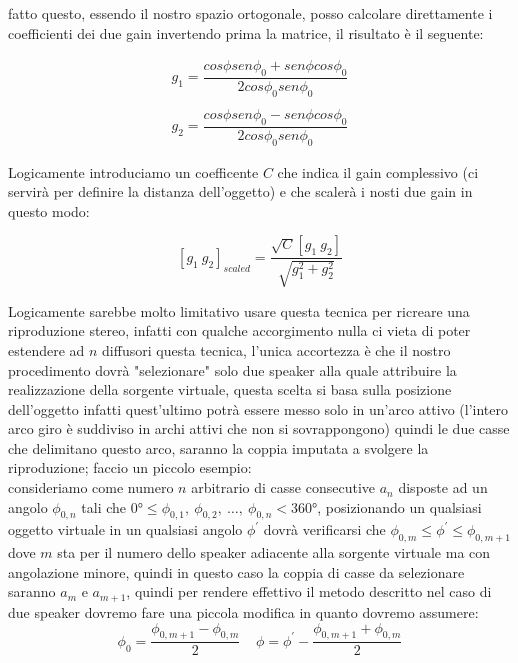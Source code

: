 \documentclass[12pt,a4paper]{report}
\begin{document}
fatto questo, essendo il nostro spazio ortogonale, posso calcolare direttamente i coefficienti dei due gain invertendo prima la matrice, il risultato è il seguente:

\begin{equation}\begin{split}
g_1=\dfrac{cos\phi sen\phi_0 + sen \phi cos\phi_0}{2 cos\phi_0 sen\phi_0}\\ \\
g_2=\dfrac{cos\phi sen\phi_0 - sen \phi cos\phi_0}{2 cos\phi_0 sen\phi_0}
\end{split}
\label{eq:eeee}
\end{equation}

Logicamente introduciamo un coefficente $C$ che indica il gain complessivo (ci servirà per definire la distanza dell'oggetto) e che scalerà i nosti due gain in questo modo:

\begin{equation}
\left[g_1 \ g_2\right]_{scaled} = \dfrac{\sqrt{C} \left[ g_1 \ g_2 \right]}{\sqrt{g_1^2 + g_2^2}} 
\label{eq:ffff}
\end{equation}

Logicamente sarebbe molto limitativo usare questa tecnica per ricreare una riproduzione stereo, infatti con qualche accorgimento nulla ci vieta di poter estendere ad $n$ diffusori questa tecnica, l'unica accortezza è che il nostro procedimento dovrà "selezionare" solo due speaker alla quale attribuire la realizzazione della sorgente virtuale, questa scelta si basa sulla posizione dell'oggetto infatti quest'ultimo potrà essere messo solo in un'arco attivo (l'intero arco giro è suddiviso in archi attivi che non si sovrappongono) quindi le due casse che delimitano questo arco, saranno la coppia imputata a svolgere la riproduzione; faccio un piccolo esempio:\\

consideriamo come numero $n$ arbitrario di casse consecutive $a_n$ disposte ad un angolo $\phi_{0,n}$ tali che $0°\leq \phi_{0,1},\ \phi_{0,2},\ \ldots,\ \phi_{0,n} <360°$, posizionando un qualsiasi oggetto virtuale in un qualsiasi angolo $\phi^{\prime}$ dovrà verificarsi che $\phi_{0,m}\leq \phi^{\prime} \leq \phi_{0,m+1}$ dove $m$ sta per il numero dello speaker adiacente alla sorgente virtuale ma con angolazione minore, quindi in questo caso la coppia di casse da selezionare saranno $a_m$ e $a_{m+1}$, quindi per rendere effettivo il metodo descritto nel caso di due speaker dovremo fare una piccola modifica in quanto dovremo assumere: \[\phi_0 = \dfrac{\phi_{0,m+1}-\phi_{0,m}}{2} \ \ \ \ \ \phi=\phi^{\prime}-\dfrac{\phi_{0,m+1}+\phi_{0,m}}{2} \]
\end{document}
